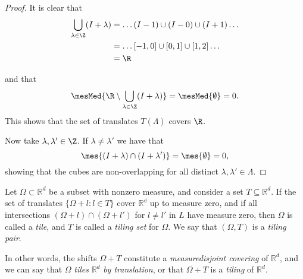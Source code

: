 \begin{proof}
    It is clear that
    \begin{align*}
        \bigcup_{\lambda\in \Z} (I + \lambda) &= \dots (I-1) \cup (I-0) \cup (I+1) \dots\\ 
        &= \dots [-1,0] \cup [0,1] \cup [1,2] \dots\\
        &= \R
    \end{align*}
    
    and that  %
    \begin{align*}  %
        \mesMed{\R \setminus \bigcup_{\lambda\in \Z} (I + \lambda) } = \mesMed{\emptyset} = 0.
    \end{align*}
    This shows that the set of translates $T(\Lambda)$ covers $\R$. %
    
    Now take $\lambda,\lambda' \in \Z$. %
    If $\lambda \neq \lambda'$ we have that 
    \begin{equation*}
        \mes{(I+\lambda) \cap (I+\lambda')} = \mes{\emptyset} = 0,
    \end{equation*}
    showing that the cubes are non-overlapping for all distinct $\lambda , \lambda' \in \Lambda$. 
\end{proof}


\begin{definition}
    Let $\Omega \subset \mathbb{R}^d$ be a subset with nonzero measure, and consider a set $T \subseteq \mathbb{R}^d$. If the set of translates ${}$$\{\Omega+l: l\in T\}$ cover $\mathbb{R^d}$ up to measure zero, and if all intersections $(\Omega+l) \cap (\Omega+l')$  for $l\neq l'$ in $L$ have measure zero, then $\Omega$ is called a \emph{tile}, and $T$ is called a \emph{tiling set} for $\Omega$. We say that $(\Omega, T)$ is a \emph{tiling pair}. 
\end{definition}

In other words, the shifts $\Omega + T$ constitute a \emph{measuredisjoint covering} of $\mathbb{R}^d$, and we can say that $\Omega$ \emph{tiles} $\mathbb{R}^d$ \emph{by translation}, or that $\Omega+T$ is a \emph{tiling} of $\mathbb{R}^d$.





